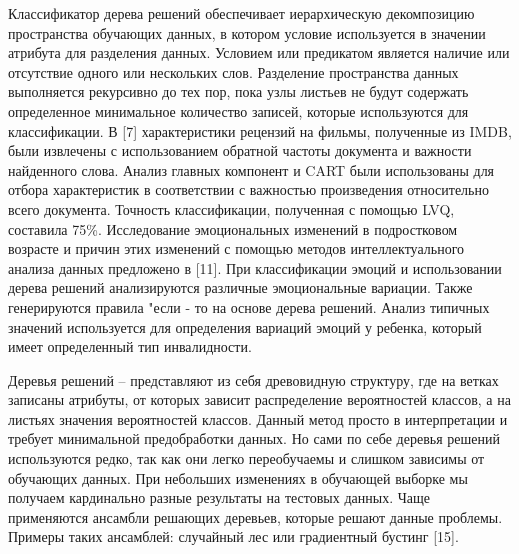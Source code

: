 Классификатор дерева решений обеспечивает иерархическую декомпозицию
пространства обучающих данных, в котором условие используется в значении
атрибута для разделения данных. Условием или предикатом является наличие или
отсутствие одного или нескольких слов. Разделение пространства данных
выполняется рекурсивно до тех пор, пока узлы листьев не будут содержать
определенное минимальное количество записей, которые используются для
классификации. В [7] характеристики рецензий на фильмы, полученные из IMDB,
были извлечены с использованием обратной частоты документа и важности найденного
слова. Анализ главных компонент и CART были использованы для отбора
характеристик в соответствии с важностью произведения относительно всего
документа. Точность классификации, полученная с помощью LVQ, составила 75\%.
Исследование эмоциональных изменений в подростковом возрасте и причин этих
изменений с помощью методов интеллектуального анализа данных предложено в [11].
При классификации эмоций и использовании дерева решений анализируются различные
эмоциональные вариации. Также генерируются правила "если - то на основе дерева
решений. Анализ типичных значений используется для определения вариаций эмоций у
ребенка, который имеет определенный тип инвалидности.~\cite{article4}

Деревья решений – представляют из себя древовидную структуру, где на ветках
записаны атрибуты, от которых зависит распределение вероятностей классов, а на
листьях значения вероятностей классов. Данный метод просто в интерпретации и
требует минимальной предобработки данных. Но сами по себе деревья решений
используются редко, так как они легко переобучаемы и слишком зависимы от
обучающих данных. При небольших изменениях в обучающей выборке мы получаем
кардинально разные результаты на тестовых данных. Чаще применяются ансамбли
решающих деревьев, которые решают данные проблемы. Примеры таких ансамблей:
случайный лес или градиентный бустинг [15].~\cite{article9}

